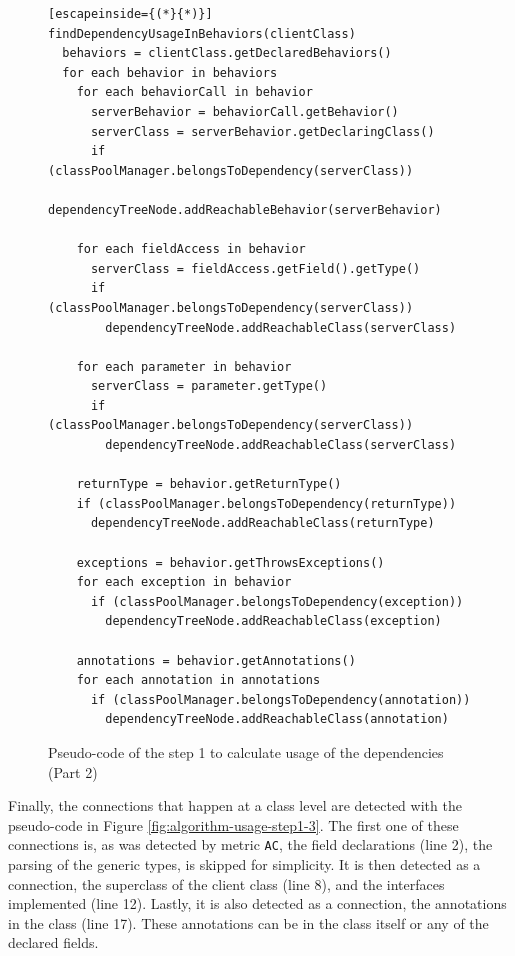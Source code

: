 \begin{figure}[h]
\begin{lstlisting}[escapeinside={(*}{*)}]
findDependencyUsageInBehaviors(clientClass)
  behaviors = clientClass.getDeclaredBehaviors()
  for each behavior in behaviors
    for each behaviorCall in behavior
      serverBehavior = behaviorCall.getBehavior()
      serverClass = serverBehavior.getDeclaringClass()
      if (classPoolManager.belongsToDependency(serverClass))
        dependencyTreeNode.addReachableBehavior(serverBehavior)

    for each fieldAccess in behavior
      serverClass = fieldAccess.getField().getType()
      if (classPoolManager.belongsToDependency(serverClass))
        dependencyTreeNode.addReachableClass(serverClass)

    for each parameter in behavior
      serverClass = parameter.getType()
      if (classPoolManager.belongsToDependency(serverClass))
        dependencyTreeNode.addReachableClass(serverClass)

    returnType = behavior.getReturnType()
    if (classPoolManager.belongsToDependency(returnType))
      dependencyTreeNode.addReachableClass(returnType)

    exceptions = behavior.getThrowsExceptions()
    for each exception in behavior
      if (classPoolManager.belongsToDependency(exception))
        dependencyTreeNode.addReachableClass(exception)

    annotations = behavior.getAnnotations()
    for each annotation in annotations
      if (classPoolManager.belongsToDependency(annotation))
        dependencyTreeNode.addReachableClass(annotation)
\end{lstlisting}
\caption{Pseudo-code of the step 1 to calculate usage of the dependencies (Part 2)}
\label{fig:algorithm-usage-step1-2}
\end{figure}

Finally, the connections that happen at a class level are detected with the pseudo-code in Figure \ref{fig:algorithm-usage-step1-3}. The first one of these connections is, as was detected by metric \texttt{AC}, the field declarations (line 2), the parsing of the generic types, is skipped for simplicity. It is then detected as a connection, the superclass of the client class (line 8), and the interfaces implemented (line 12). Lastly, it is also detected as a connection, the annotations in the class (line 17). These annotations can be in the class itself or any of the declared fields.

